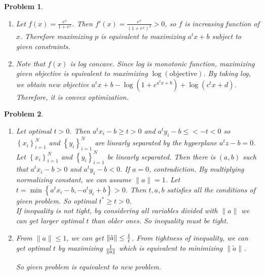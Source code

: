 \documentclass{oblivoir}
\newtheorem{problem}{Problem}
\begin{document}
\begin{problem}
	\begin{enumerate}[label = (\alph*)]
		\item Let $f(x) = \frac{e^x}{1+e^x}$. Then $f'(x) = \frac{e^x}{\left( 1+e^x \right)^2} > 0$, so $f$ is increasing function of $x$.
		Therefore maximizing $p$ is equivalent to maximizing $a^t x + b$ subject to given constraints.
		
	\item Note that $f(x)$ is log concave. Since log is monotonic function, maximizing given objective is equivalent to maximizing $\log(\text{objective})$. By taking log, we obtain new objective $a^tx + b - \log(1+e^{a^t x + b}) +\log(c^tx +d)$. Therefore, it is convex optimization.
	\end{enumerate}
\end{problem}

\begin{problem}
	\begin{enumerate}[label = (\alph*)]
		\item Let optimal $t >0$. Then $a^t x_i -b \geq t > 0$ and $a^t y_i -b \leq < -t < 0$ so $\left \{ x_i \right \} _{i=1}^{N}$ and $\left \{y_i\right \}_{i=1}^{N}$ are linearly separated by the hyperplane $a^t z - b = 0$. \\

			Let $\left\{ x_i \right\}_{i=1}^N$ and $\left\{ y_i \right\}_{i=1}^N$ be linearly separated. Then there is $\left( a, b \right)$ such that $a^t x_i -b > 0$ and $a^t y_i -b <0$.
			If $a = 0$, contradiction. By multiplying normalizing constant, we can assume $\|a \| = 1$.
			Let $t = \min\left\{ a^t x_i - b, -a^t y_i + b \right\} >0$. Then $t, a, b$ satisfies all the conditions of given problem. So optimal $t^* \geq t >0$. \\

			If inequality is not tight, by considering all variables divided with $\|a \|$ we can get larger optimal $t$ than older ones. So inequality must be tight.

		\item From $\| a \| \leq 1$, we can get $\| \tilde{a} \| \leq {1\over t}$. From tightness of inequality, we can get optimal $t$ by maximizing ${1\over \| \tilde{a} \|}$ which is equivalent to minimizing $\| \tilde{a} \|$.

			So given problem is equivalent to new problem.

	\end{enumerate}
\end{problem}
\end{document}
